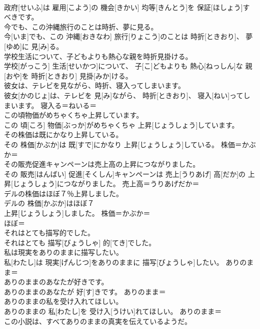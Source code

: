 \documentclass[8pt]{extreport}
\begin{document}
\begin{CJK}{UTF8}{min}
\\	政府[せいふ]は 雇用[こよう]の 機会[きかい] 均等[きんとう]を 保証[ほしょう]すべきです。	
\\	今でも、この沖縄旅行のことは時折、夢に見る。	
\\	今[いま]でも、この 沖縄[おきなわ] 旅行[りょこう]のことは 時折[ときおり]、 夢[ゆめ]に 見[み]る。	
\\	学校生活について、子どもよりも熱心な親を時折見掛ける。	
\\	学校[がっこう] 生活[せいかつ]について、 子[こ]どもよりも 熱心[ねっしん]な 親[おや]を 時折[ときおり] 見掛[みか]ける。	
\\	彼女は、テレビを見ながら、時折、寝入ってしまいます。	
\\	彼女[かのじょ]は、テレビを 見[み]ながら、 時折[ときおり]、 寝入[ねい]ってしまいます。	寝入る＝ねいる＝ 
\\	この頃物価がめちゃくちゃ上昇しています。	
\\	この 頃[ころ] 物価[ぶっか]がめちゃくちゃ 上昇[じょうしょう]しています。	
\\	その株価は既にかなり上昇している。	
\\	その 株価[かぶか]は 既[すで]にかなり 上昇[じょうしょう]している。	株価＝かぶか＝ 
\\	その販売促進キャンペーンは売上高の上昇につながりました。	
\\	その 販売[はんばい] 促進[そくしん]キャンペーンは 売上[うりあげ] 高[だか]の 上昇[じょうしょう]につながりました。	売上高＝うりあげだか＝ 
\\	デルの株価はほぼ７％上昇しました。	
\\	デルの 株価[かぶか]はほぼ７ 
\\	[ぱーせんと] 上昇[じょうしょう]しました。	株価＝かぶか＝ 
\\	ほぼ＝ 
\\	それはとても描写的でした。	
\\	それはとても 描写[びょうしゃ] 的[てき]でした。	
\\	私は現実をありのままに描写したい。	
\\	私[わたし]は 現実[げんじつ]をありのままに 描写[びょうしゃ]したい。	ありのまま＝ 
\\	ありのままのあなたが好きです。	
\\	ありのままのあなたが 好[す]きです。	ありのまま＝ 
\\	ありのままの私を受け入れてほしい。	
\\	ありのままの 私[わたし]を 受け入[うけい]れてほしい。	ありのまま＝ 
\\	この小説は、すべてありのままの真実を伝えているようだ。	

\end{CJK}
\end{document}
